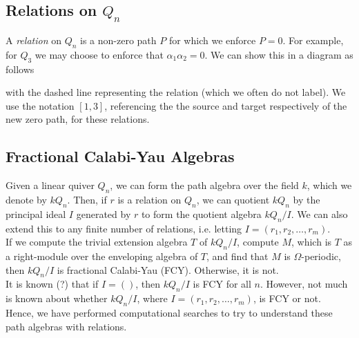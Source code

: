 \documentclass{article}
\begin{document}
\begin{flushleft}
   \subsection{Relations on $Q_n$}
   A \textit{relation} on $Q_n$ is a non-zero path $P$ for which we enforce $P = 0$. For example,
   for $Q_3$ we may choose to enforce that $\alpha_1\alpha_2 = 0$. We can show this in a diagram as follows
   \begin{center}
   \end{center}
   with the dashed line representing the relation (which we often do not label). We use the notation
   $[1,3]$, referencing the the source and target respectively of the new zero path, for these
   relations.

   \subsection{Fractional Calabi-Yau Algebras}
   Given a linear quiver $Q_n$, we can form the path algebra over the field $k$, which we denote by
   $kQ_n$. Then, if $r$ is a relation on $Q_n$, we can quotient $kQ_n$ by the principal ideal $I$
   generated by $r$ to form the quotient algebra $kQ_n / I$. We can also extend this to
   any finite number of relations, i.e. letting $I = (r_1, r_2, \ldots, r_m)$. \\[\baselineskip]

   If we compute the trivial extension algebra $T$ of $kQ_n/I$, compute $M$, which is $T$ as a right-module
   over the enveloping algebra of $T$, and find that $M$ is $\Omega$-periodic, then $kQ_n/I$ is 
   fractional Calabi-Yau (FCY). Otherwise, it is not. \\[\baselineskip]

   It is known (?) that if $I = ()$, then $kQ_n/I$ is FCY for all $n$. However, not much is known
   about whether $kQ_n/I$, where $I = (r_1, r_2, \ldots, r_m)$, is FCY or not. \\[\baselineskip]

   Hence, we have performed computational searches to try to understand these path algebras with 
   relations.


\end{flushleft}
\end{document}

